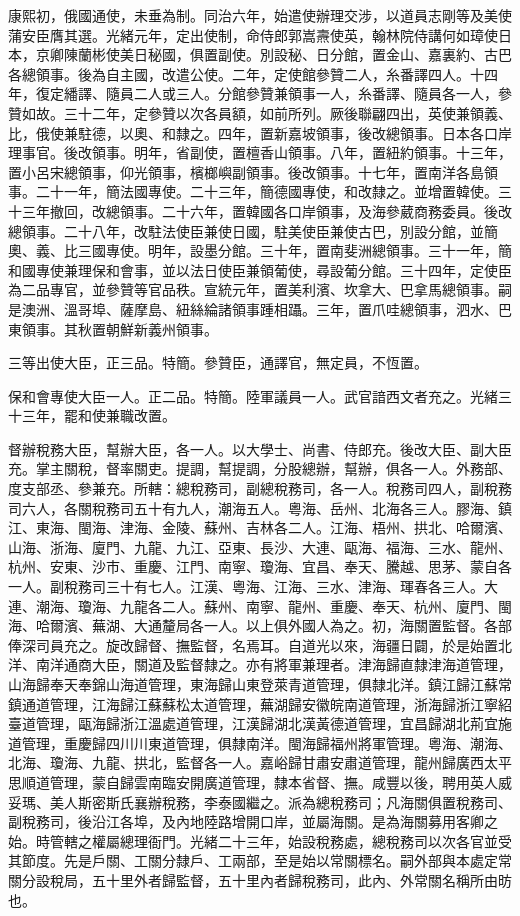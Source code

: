 \begin{pinyinscope}
康熙初，俄國通使，未垂為制。同治六年，始遣使辦理交涉，以道員志剛等及美使蒲安臣膺其選。光緒元年，定出使制，命侍郎郭嵩燾使英，翰林院侍講何如璋使日本，京卿陳蘭彬使美日秘國，俱置副使。別設秘、日分館，置金山、嘉裏約、古巴各總領事。後為自主國，改遣公使。二年，定使館參贊二人，糸番譯四人。十四年，復定繙譯、隨員二人或三人。分館參贊兼領事一人，糸番譯、隨員各一人，參贊如故。三十二年，定參贊以次各員額，如前所列。厥後聯翩四出，英使兼領義、比，俄使兼駐德，以奧、和隸之。四年，置新嘉坡領事，後改總領事。日本各口岸理事官。後改領事。明年，省副使，置檀香山領事。八年，置紐約領事。十三年，置小呂宋總領事，仰光領事，檳榔嶼副領事。後改領事。十七年，置南洋各島領事。二十一年，簡法國專使。二十三年，簡德國專使，和改隸之。並增置韓使。三十三年撤回，改總領事。二十六年，置韓國各口岸領事，及海參葳商務委員。後改總領事。二十八年，改駐法使臣兼使日國，駐美使臣兼使古巴，別設分館，並簡奧、義、比三國專使。明年，設墨分館。三十年，置南斐洲總領事。三十一年，簡和國專使兼理保和會事，並以法日使臣兼領葡使，尋設葡分館。三十四年，定使臣為二品專官，並參贊等官品秩。宣統元年，置美利濱、坎拿大、巴拿馬總領事。嗣是澳洲、溫哥埠、薩摩島、紐絲綸諸領事踵相躡。三年，置爪哇總領事，泗水、巴東領事。其秋置朝鮮新義州領事。

三等出使大臣，正三品。特簡。參贊臣，通譯官，無定員，不恆置。

保和會專使大臣一人。正二品。特簡。陸軍議員一人。武官諳西文者充之。光緒三十三年，罷和使兼職改置。

督辦稅務大臣，幫辦大臣，各一人。以大學士、尚書、侍郎充。後改大臣、副大臣充。掌主關稅，督率關吏。提調，幫提調，分股總辦，幫辦，俱各一人。外務部、度支部丞、參兼充。所轄：總稅務司，副總稅務司，各一人。稅務司四人，副稅務司六人，各關稅務司五十有九人，潮海五人。粵海、岳州、北海各三人。膠海、鎮江、東海、閩海、津海、金陵、蘇州、吉林各二人。江海、梧州、拱北、哈爾濱、山海、浙海、廈門、九龍、九江、亞東、長沙、大連、甌海、福海、三水、龍州、杭州、安東、沙市、重慶、江門、南寧、瓊海、宜昌、奉天、騰越、思茅、蒙自各一人。副稅務司三十有七人。江漢、粵海、江海、三水、津海、琿春各三人。大連、潮海、瓊海、九龍各二人。蘇州、南寧、龍州、重慶、奉天、杭州、廈門、閩海、哈爾濱、蕪湖、大通釐局各一人。以上俱外國人為之。初，海關置監督。各部俸深司員充之。旋改歸督、撫監督，名焉耳。自道光以來，海疆日闢，於是始置北洋、南洋通商大臣，關道及監督隸之。亦有將軍兼理者。津海歸直隸津海道管理，山海歸奉天奉錦山海道管理，東海歸山東登萊青道管理，俱隸北洋。鎮江歸江蘇常鎮通道管理，江海歸江蘇蘇松太道管理，蕪湖歸安徽皖南道管理，浙海歸浙江寧紹臺道管理，甌海歸浙江溫處道管理，江漢歸湖北漢黃德道管理，宜昌歸湖北荊宜施道管理，重慶歸四川川東道管理，俱隸南洋。閩海歸福州將軍管理。粵海、潮海、北海、瓊海、九龍、拱北，監督各一人。嘉峪歸甘肅安肅道管理，龍州歸廣西太平思順道管理，蒙自歸雲南臨安開廣道管理，隸本省督、撫。咸豐以後，聘用英人威妥瑪、美人斯密斯氏襄辦稅務，李泰國繼之。派為總稅務司；凡海關俱置稅務司、副稅務司，後沿江各埠，及內地陸路增開口岸，並屬海關。是為海關募用客卿之始。時管轄之權屬總理衙門。光緒二十三年，始設稅務處，總稅務司以次各官並受其節度。先是戶關、工關分隸戶、工兩部，至是始以常關標名。嗣外部與本處定常關分設稅局，五十里外者歸監督，五十里內者歸稅務司，此內、外常關名稱所由昉也。


\end{pinyinscope}
